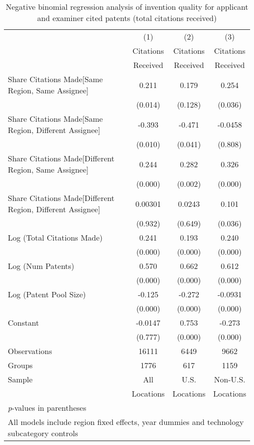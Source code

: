 {
\begin{longtable}{l*{3}{c}}
\caption{Negative binomial regression analysis of invention quality for applicant and examiner cited patents (total citations received) \label{ae.model123}}\\
\hline\hline\endfirsthead\hline\endhead\hline\endfoot\endlastfoot
                &\multicolumn{1}{c}{(1)}&\multicolumn{1}{c}{(2)}&\multicolumn{1}{c}{(3)}\\
                &\multicolumn{1}{c}{Citations}&\multicolumn{1}{c}{Citations}&\multicolumn{1}{c}{Citations}\\
                 &\multicolumn{1}{c}{Received}&\multicolumn{1}{c}{Received}&\multicolumn{1}{c}{Received}\\
\hline
Share Citations Made[Same Region, Same Assignee]&    0.211&    0.179&    0.254\\
                &  (0.014)&  (0.128)&  (0.036)\\
Share Citations Made[Same Region, Different Assignee]&   -0.393&   -0.471&  -0.0458\\
                &  (0.010)&  (0.041)&  (0.808)\\
Share Citations Made[Different Region, Same Assignee]&    0.244&    0.282&    0.326\\
                &  (0.000)&  (0.002)&  (0.000)\\
Share Citations Made[Different Region, Different Assignee]&  0.00301&   0.0243&    0.101\\
                &  (0.932)&  (0.649)&  (0.036)\\
Log (Total Citations Made)&    0.241&    0.193&    0.240\\
                &  (0.000)&  (0.000)&  (0.000)\\
Log (Num Patents)&    0.570&    0.662&    0.612\\
                &  (0.000)&  (0.000)&  (0.000)\\
Log (Patent Pool Size)&   -0.125&   -0.272&  -0.0931\\
                &  (0.000)&  (0.000)&  (0.000)\\
Constant        &  -0.0147&    0.753&   -0.273\\
                &  (0.777)&  (0.000)&  (0.000)\\
\hline
Observations    &    16111&     6449&     9662\\
Groups          &     1776&      617&     1159\\
Sample&All &U.S. &Non-U.S. \\
          &Locations &Locations&Locations \\
\hline\hline
\multicolumn{4}{l}{\footnotesize \textit{p}-values in parentheses}\\
\multicolumn{4}{l}{\footnotesize All models include region fixed effects, year dummies and technology subcategory controls}\\
\end{longtable}
}
